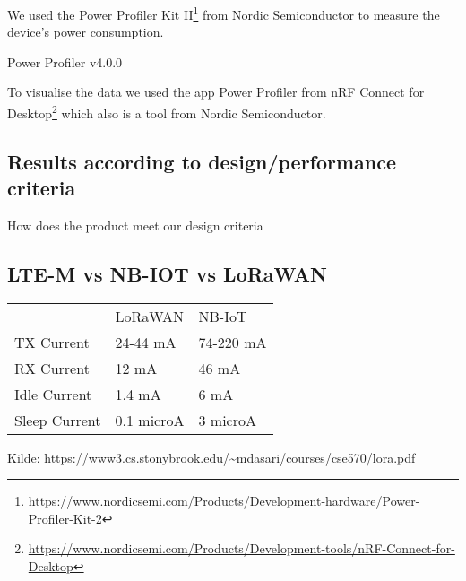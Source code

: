 We used the Power Profiler Kit II\footnote{\url{https://www.nordicsemi.com/Products/Development-hardware/Power-Profiler-Kit-2}} from Nordic Semiconductor to measure the device's power consumption.

Power Profiler v4.0.0

To visualise the data we used the app Power Profiler from nRF Connect for Desktop\footnote{\url{https://www.nordicsemi.com/Products/Development-tools/nRF-Connect-for-Desktop}} which also is a tool from Nordic Semiconductor.

\subsection{Results according to design/performance criteria}
How does the product meet our design criteria

\subsection{LTE-M vs NB-IOT vs LoRaWAN}

\begin{table}[H]
\centering
\begin{tabular}{lll}
              & LoRaWAN    & NB-IoT    \\
TX Current    & 24-44 mA   & 74-220 mA \\
RX Current    & 12 mA      & 46 mA     \\
Idle Current  & 1.4 mA     & 6 mA      \\
Sleep Current & 0.1 microA & 3 microA 
\end{tabular}
\end{table}
Kilde: \url{https://www3.cs.stonybrook.edu/~mdasari/courses/cse570/lora.pdf}

